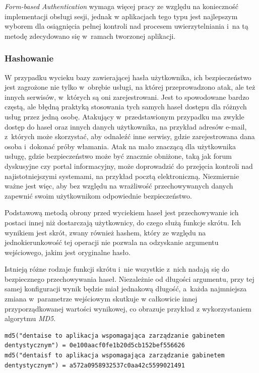 \documentclass[11pt]{aghdpl}
\begin{document}
\emph{Form-based Authentication} wymaga więcej pracy ze względu na konieczność implementacji obsługi sesji, jednak w aplikacjach tego typu jest najlepszym wyborem dla osiągnięcia pełnej kontroli nad procesem uwierzytelniania i~na tą metodę zdecydowano się w~ramach tworzonej aplikacji.

\subsubsection{Hashowanie}
\label{sec:hashowanie}

W przypadku wycieku bazy zawierającej hasła użytkownika, ich bezpieczeństwo jest zagrożone nie tylko w~obrębie usługi, na której przeprowadzono atak, ale też innych serwisów, w~których są oni zarejestrowani. Jest to spowodowane bardzo częstą, ale błędną praktyką stosowania tych samych haseł dostępu dla różnych usług przez jedną osobę. Atakujący w~przedstawionym przypadku ma zwykle dostęp do haseł oraz innych danych użytkownika, na przykład adresów e-mail, z~których może skorzystać, aby odnaleźć inne serwisy, gdzie zarejestrowana dana osoba i~dokonać próby włamania. Atak na mało znaczącą dla użytkownika usługę, gdzie bezpieczeństwo może być znacznie obniżone, taką jak forum dyskusyjne czy portal informacyjny, może doprowadzić do przejęcia kontroli nad najistotniejszymi systemami, na przykład pocztą elektroniczną. Niezmiernie ważne jest więc, aby bez względu na wrażliwość przechowywanych danych zapewnić swoim użytkownikom odpowiednie bezpieczeństwo.

Podstawową metodą obrony przed wyciekiem haseł jest przechowywanie ich postaci innej niż dostarczają użytkownicy, do czego służą funkcje skrótu. Ich wynikiem jest skrót, zwany również hashem, który ze względu na jednokierunkowość tej operacji nie pozwala na odzyskanie argumentu wejściowego, jakim jest oryginalne hasło.

Istnieją różne rodzaje funkcji skrótu i~nie wszystkie z~nich nadają się do bezpiecznego przechowywania haseł. Niezależnie od długości argumentu, przy tej samej konfiguracji wynik będzie miał jednakową długość, a~każda najmniejsza zmiana w~parametrze wejściowym skutkuje w całkowicie innej przyporządkowanej wartości wynikowej, co obrazuje przykład z wykorzystaniem algorytmu \emph{MD5}.

\begin{lstlisting}
md5("dentaise to aplikacja wspomagająca zarządzanie gabinetem dentystycznym") = 0e100aacf0fe1b20d5cb152bef556626
md5("dentaisf to aplikacja wspomagająca zarządzanie gabinetem dentystycznym") = a572a0958932537c0aa42c5599021491
\end{lstlisting}
\end{document}
